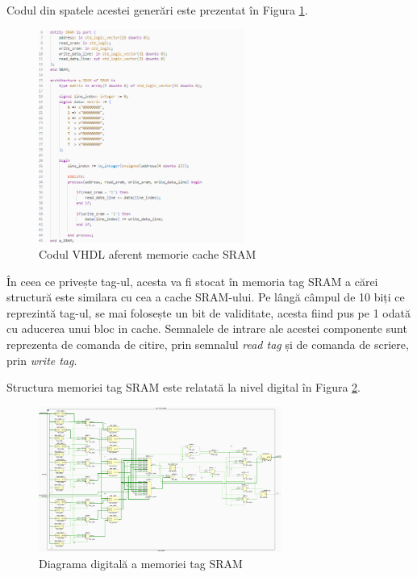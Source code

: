 \documentclass[12pt]{article}
\begin{document}
 Codul din spatele acestei generări este prezentat în Figura  \ref{Figura:56}.
  \begin{figure}[h!]
 \includegraphics[width=0.6\textwidth]{cachesramcode.png}
 \centering
 \caption{Codul VHDL aferent memorie cache SRAM}
 \label{Figura:56}
 \end{figure}

În ceea ce privește tag-ul, acesta va fi stocat în memoria tag SRAM a cărei structură este similara cu cea a cache SRAM-ului. Pe lângă câmpul de 10 biți ce reprezintă tag-ul, se mai folosește un bit de validitate, acesta fiind pus pe 1 odată cu aducerea unui bloc in cache. Semnalele de intrare ale acestei componente sunt reprezenta de comanda de citire, prin semnalul \textit{read tag} și de comanda de scriere, prin \textit{write tag}.

Structura memoriei tag SRAM este relatată la nivel digital în Figura \ref{Figura:57}.

  \begin{figure}[h!]
 \includegraphics[angle=-90,width=0.71\textwidth]{tagsram.png}
 \centering
 \caption{Diagrama digitală a memoriei tag SRAM}
 \label{Figura:57}
 \end{figure}
 
\end{document}
